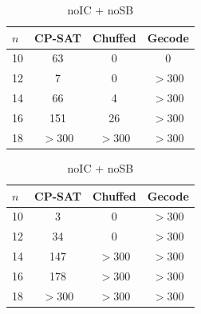 \documentclass{article}
\begin{document}
\begin{table}[H]\centering\small
\begin{minipage}{.48\textwidth}\centering
\begin{tabular}{l|ccc}\toprule
$n$ & CP-SAT & Chuffed & Gecode\\\midrule
10 & 63 & 0 & 0\\
12 & 7 & 0 & \(>300\)\\
14 & 66 & 4 & \(>300\)\\
16 & 151 & 26 & \(>300\)\\
18 & \(>300\) & \(>300\) & \(>300\)\\\bottomrule
\end{tabular}
\caption{noIC (SB on)}
\end{minipage}\hfill
\begin{minipage}{.48\textwidth}\centering
\begin{tabular}{l|ccc}\toprule
$n$ & CP-SAT & Chuffed & Gecode\\\midrule
10 & 3 & 0 & \(>300\)\\
12 & 34 & 0 & \(>300\)\\
14 & 147 & \(>300\) & \(>300\)\\
16 & 178 & \(>300\) & \(>300\)\\
18 & \(>300\) & \(>300\) & \(>300\)\\\bottomrule
\end{tabular}
\caption{noIC + noSB}
\end{minipage}
\end{table}
\end{document}
